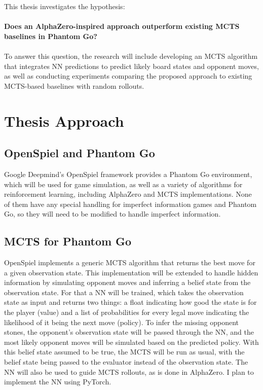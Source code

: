 \documentclass[12pt,oneside,openright]{article}
\begin{document}
This thesis investigates the hypothesis:
\\
\\
\textbf{Does an AlphaZero-inspired approach outperform existing MCTS baselines in Phantom Go?}
\\
\\
To answer this question, the research will include developing an MCTS algorithm that integrates NN predictions to predict likely board states and opponent moves, as well as conducting experiments comparing the proposed approach to existing MCTS-based baselines with random rollouts.


\section{Thesis Approach}


\subsection{OpenSpiel and Phantom Go}

Google Deepmind's OpenSpiel framework provides a Phantom Go environment, which will be used for game simulation, as well as a variety of algorithms for reinforcement learning, including AlphaZero and MCTS implementations. None of them have any special handling for imperfect information games and Phantom Go, so they will need to be modified to handle imperfect information.

\subsection{MCTS for Phantom Go}

OpenSpiel implements a generic MCTS algorithm that returns the best move for a given observation state. This implementation will be extended to handle hidden information by simulating opponent moves and inferring a belief state from the observation state. For that a NN will be trained, which takes the observation state as input and returns two things: a float indicating how good the state is for the player (value) and a list of probabilities for every legal move indicating the likelihood of it being the next move (policy). To infer the missing opponent stones, the opponent's observation state will be passed through the NN, and the most likely opponent moves will be simulated based on the predicted policy. With this belief state assumed to be true, the MCTS will be run as usual, with the belief state being passed to the evaluator instead of the observation state. The NN will also be used to guide MCTS rollouts, as is done in AlphaZero. I plan to implement the NN using PyTorch.
\end{document}
